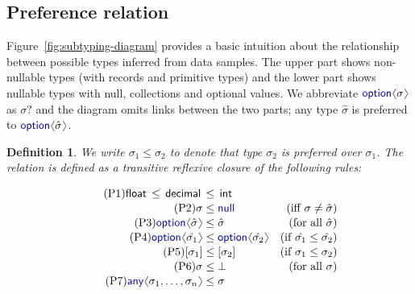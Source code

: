 \documentclass[10pt,preprint,blind,clearpagebib]{sigplanconf}
\newcommand{\langl}{\begin{picture}(4.5,7)
\put(1.1,2.5){\rotatebox{60}{\line(1,0){5.5}}}
\put(1.1,2.5){\rotatebox{300}{\line(1,0){5.5}}}
\end{picture}}
\newcommand{\rangl}{\begin{picture}(4.5,7)
\put(.9,2.5){\rotatebox{120}{\line(1,0){5.5}}}
\put(.9,2.5){\rotatebox{240}{\line(1,0){5.5}}}
\end{picture}}
\newcommand{\kvd}[1]{\textnormal{\textcolor{kvdclr}{\sffamily #1}}}
\newcommand{\ident}[1]{\textnormal{\sffamily #1}}
\newtheorem{definition}{Definition}
\begin{document}
\subsection{Preference relation}
\label{sec:inference-subtyping}

Figure~\ref{fig:subtyping-diagram} provides a basic intuition about the relationship between
possible types inferred from data samples. The upper part shows non-nullable types (with records and primitive types) and 
the lower part shows nullable types with \kvd{null}, collections and optional values. We 
abbreviate $\kvd{option}\langl\sigma\rangl$ as $\sigma?$ and the diagram omits links between the two parts;
any type $\hat{\sigma}$ is preferred to $\kvd{option}\langl\hat{\sigma}\rangl$.

\begin{definition}
We write $\sigma_1 \leq \sigma_2$ to denote that type $\sigma_2$ is preferred over $\sigma_1$. The 
relation is defined as a transitive reflexive closure of the following rules:

\noindent
\begin{align}
  \label{eq:sub-prim}\tag{P1}
  \ident{float}\,\leq\,\ident{decimal}\,&\leq\,\ident{int}&\\[-0.2em]
  \label{eq:sub-null}\tag{P2}
  \sigma &\leq \kvd{null}  &(\textnormal{iff}~\sigma \neq \hat{\sigma})  \\[-0.2em]
  \label{eq:sub-opt}\tag{P3}
  \kvd{option}\langl\hat{\sigma}\rangl &\leq \hat{\sigma}  &(\textnormal{for all}~\hat{\sigma})\\[-0.2em]
  \label{eq:sub-opt-cov}\tag{P4}
  \kvd{option}\langl\hat{\sigma_1}\rangl &\leq 
    \kvd{option}\langl\hat{\sigma_2}\rangl  &(\textnormal{if}~\hat{\sigma_1} \leq \hat{\sigma_2})\\[-0.2em]
  \label{eq:sub-col}\tag{P5}
  [\sigma_1] &\leq [\sigma_2]  &(\textnormal{if}~\sigma_1 \leq \sigma_2) \\[-0.2em]
  \label{eq:sub-bot}\tag{P6}
  \sigma &\leq \bot  &(\textnormal{for all}~\sigma)\\[-0.2em]
  \label{eq:sub-var-top}\tag{P7}
  \kvd{any}\langl \sigma_1, \ldots, \sigma_n\rangl &\leq \sigma 
\end{align}


\end{definition}
\end{document}
